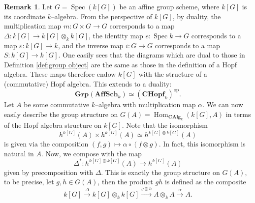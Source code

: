 \documentclass{article}
\theoremstyle{plain}
\theoremstyle{definition}
\newtheorem{Rem}[Th]{Remark}
\DeclareMathOperator{\Hom}{Hom}
\DeclareMathOperator{\Spec}{Spec}
\begin{document}
\begin{Rem}
  Let $G=\Spec (k[G])$ be an affine group scheme, where $k[G]$ is its coordinate $k$--algebra. From the perspective of $k[G]$, by duality, the multiplication map $m\colon G\times G\to G$ corresponds to a map $\Delta\colon k[G]\to k[G]\otimes_k k[G]$, the identity map $e\colon\Spec k\to G$ corresponds to a map $\varepsilon\colon k[G]\to k$, and the inverse map $i\colon G\to G$ corresponds to a map $S\colon k[G]\to k[G]$. One easily sees that the diagrams which are dual to those in Definition \ref{def:group object} are the same as those in the definition of a Hopf algebra. These maps therefore endow $k[G]$ with the structure of a (commutative) Hopf algebra. This extends to a duality:
  \[
  \textbf{Grp}(\textbf{AffSch}_k) \simeq (\textbf{CHopf}_k)^{\text{op}}.
  \]
 Let $A$ be some commutative $k$--algebra with multiplication map $\alpha$. We can now easily describe the group structure on $G(A)=\Hom_{\textbf{CAlg}_k}(k[G], A)$ in terms of the Hopf algebra structure on $k[G]$. Note that the isomorphism 
 \[
 h^{k[G]}(A) \times h^{k[G]}(A) \simeq h^{k[G]\otimes k[G]}(A)
 \]
  is given via the composition $(f, g) \mapsto \alpha \circ (f\otimes g)$. In fact, this isomorphism is natural in $A$.  Now, we compose with the map 
  \[
  \Delta^*\colon h^{k[G]\otimes k[G]}(A) \to h^{k[G]}(A)
  \]
  given by precomposition with $\Delta$. This is exactly the group structure on $G(A)$, to be precise, let $g, h\in G(A)$, then the product $gh$ is defined as the composite 
  \[
  k[G]\xrightarrow{\Delta} k[G] \otimes_k k[G] \xrightarrow{g\otimes h} A\otimes_k A \xrightarrow{\alpha} A.
  \]
 
 
\end{Rem}
\end{document}
